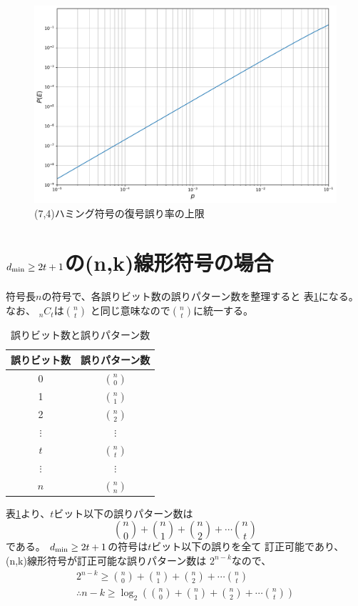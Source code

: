 \documentclass[a4paper,11pt]{jsarticle}
\begin{document}
\begin{figure}[htbp]
  \begin{center}
  \includegraphics[scale=0.5]{figures/test.pdf}
  \end{center}
  \caption{(7,4)ハミング符号の復号誤り率の上限
  \label{fig:error-max}
  }
\end{figure}

\section{$d_{\rm min} \geq 2t+1$の(n,k)線形符号の場合}
符号長$n$の符号で、各誤りビット数の誤りパターン数を整理すると
表\ref{table:error-bits-num}になる。なお、
${}_nC_t$は$\binom{n}{t}$
と同じ意味なので$\binom{n}{t}$に統一する。
\begin{table}[hbtp]
  \caption{誤りビット数と誤りパターン数}
  \label{table:error-bits-num}
  \centering
  \begin{tabular}{|cc|}
    \hline
    誤りビット数 & 誤りパターン数 \\ \hline \hline
    0 & $\binom{n}{0}$ \\ \hline
    1 & $\binom{n}{1}$ \\ \hline 
    2 & $\binom{n}{2}$ \\ \hline 
    $\vdots$ & $\vdots$ \\ \hline
    $t$ & $\binom{n}{t}$ \\ \hline
    $\vdots$ & $\vdots$ \\ \hline
    $n$ & $\binom{n}{n}$ \\ \hline
  \end{tabular}
\end{table}
表\ref{table:error-bits-num}より、$t$ビット以下の誤りパターン数は
\[
  \binom{n}{0}+\binom{n}{1}+\binom{n}{2}+\cdots \binom{n}{t}
\]
である。
$d_{\rm min} \geq 2t+1$の符号は$t$ビット以下の誤りを全て
訂正可能であり、(n,k)線形符号が訂正可能な誤りパターン数は
$2^{n-k}$なので、
\begin{eqnarray*}
  2^{n-k} \geq \binom{n}{0}+\binom{n}{1}+\binom{n}{2}+\cdots \binom{n}{t} \\
  \therefore n-k \geq \log_2\left(\binom{n}{0}+\binom{n}{1}+\binom{n}{2}+\cdots \binom{n}{t}\right)
\end{eqnarray*}
\end{document}
